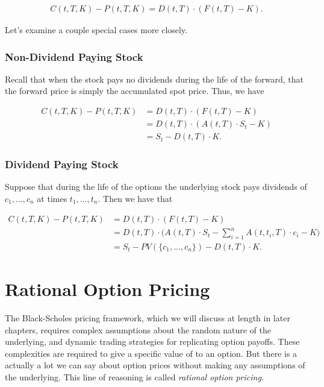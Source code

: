 \documentclass[11pt,]{krantz}
\begin{document}
\begin{align*}
C(t, T, K) - P(t, T, K) = D(t, T) \cdot (F(t, T) - K).
\end{align*}

Let's examine a couple special cases more closely.

\subsubsection*{Non-Dividend Paying Stock}\label{non-dividend-paying-stock}

Recall that when the stock pays no dividends during the life of the forward, that the forward price is simply the accumulated spot price. Thus, we have

\begin{align*}
C(t, T, K) - P(t, T, K) &= D(t, T) \cdot (F(t, T) - K) \\
                        &= D(t, T) \cdot (A(t, T) \cdot S_{t} - K) \\
                        &= S_{t} - D(t, T) \cdot K.
\end{align*}

\subsubsection*{Dividend Paying Stock}\label{dividend-paying-stock}

Suppose that during the life of the options the underlying stock pays dividends of \(c_{1}, \ldots, c_{n}\) at times \(t_{1}, \ldots, t_{n}\). Then we have that

\begin{align*}
C(t, T, K) - P(t, T, K) &= D(t, T) \cdot (F(t, T) - K) \\
                        &= D(t, T) \cdot \bigg(A(t, T) \cdot S_{t} - \sum_{i=1}^{n} A(t, t_{i}, T) \cdot c_{i} - K \bigg) \\
                        &= S_{t} - PV(\{c_{1}, \ldots, c_{n} \}) - D(t, T) \cdot K.
\end{align*}

\section{Rational Option Pricing}\label{rational-option-pricing}

The Black-Scholes pricing framework, which we will discuss at length in later chapters, requires complex assumptions about the random nature of the underlying, and dynamic trading strategies for replicating option payoffs. These complexities are required to give a specific value of to an option. But there is a actually a lot we can say about option prices without making any assumptions of the underlying. This line of reasoning is called \emph{rational option pricing}.
\end{document}
